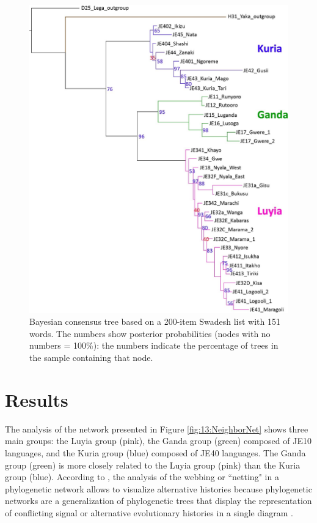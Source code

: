 \documentclass[output=paper]{langscibook}
\begin{document}
\begin{figure}
  \caption{Bayesian consensus tree based on a 200-item Swadesh list with 151 words. The numbers show posterior probabilities (nodes with no numbers = 100\%): the numbers indicate the percentage of trees in the sample containing that node.}
  \label{fig:14:Bayesian}
   \includegraphics[width=\textwidth]{figures/14 Bayesian consensus tree.jpg}
\end{figure}

\section{Results}
\label{sec:4:Results}

The analysis of the network presented in Figure \ref{fig:13:NeighborNet} shows three main groups: the Luyia group (pink), the Ganda group (green) composed of JE10 languages, and the Kuria group (blue) composed of JE40 languages. The Ganda group (green) is more closely related to the Luyia group (pink) than the Kuria group (blue). According to \citet{fitch_networks_1997}, the analysis of the webbing or ``netting" in a phylogenetic network allows to visualize alternative histories because phylogenetic networks are a generalization of phylogenetic trees that display the representation of conflicting signal or alternative evolutionary histories in a single diagram \citep{bryant_neighbor-net:_2004}. 
\end{document}
